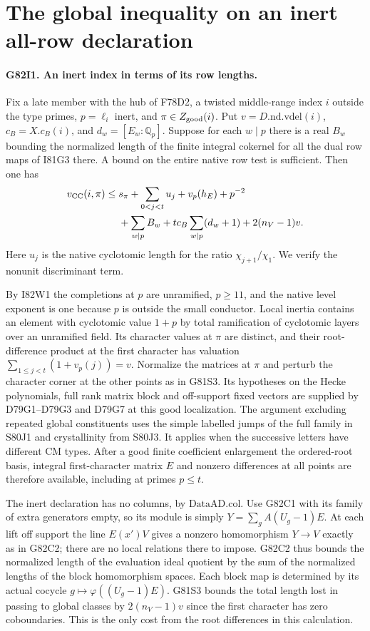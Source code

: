 \section{The global inequality on an inert all-row declaration}

\paragraph{G82I1. An inert index in terms of its row lengths.}
Fix a late member with the hub of F78D2, a twisted middle-range
index $i$ outside the type primes, $p=\ell_i$ inert, and
$\pi\in Z_{\rm good}(i)$. Put $v=D.\mathrm{nd.vdel}(i)$,
$c_B=X.c_B(i)$, and $d_w=[E_w:\mathbb Q_p]$. Suppose for each
$w\mid p$ there is a real $B_w$ bounding the normalized length
of the finite integral cokernel for all the dual row maps of
I81G3 there. A bound on the entire native row test is sufficient.
Then one has
\[
\begin{aligned}
 v_{\rm CC}(i,\pi)\le {}&
     s_\pi+\sum_{0<j<t}u_j+v_p(h_E)+p^{-2}\\
 &+\sum_{w\mid p} B_w+
       t c_B\sum_{w\mid p}(d_w+1)+2(n_V-1)v .
\end{aligned}
\]
Here $u_j$ is the native cyclotomic length for the ratio
$\chi_{j+1}/\chi_1$. We verify the nonunit discriminant term.

By I82W1 the completions at $p$ are unramified, $p\ge11$, and the
native level exponent is one because $p$ is outside the small
conductor. Local inertia contains an element with cyclotomic
value $1+p$ by total ramification of cyclotomic layers over an
unramified field. Its character values at $\pi$ are distinct,
and their root-difference product at the first character has
valuation $\sum_{1\le j<t}(1+v_p(j))=v$. Normalize the matrices
at $\pi$ and perturb the character corner at the other points
as in G81S3. Its hypotheses on the Hecke polynomials, full
rank matrix block and off-support fixed vectors are supplied by
D79G1--D79G3 and D79G7 at this good localization. The argument
excluding repeated global constituents uses the simple labelled
jumps of the full family in S80J1 and crystallinity from S80J3.
It applies when the successive letters have different CM types.
After a good finite coefficient enlargement the ordered-root basis,
integral first-character matrix $E$ and nonzero differences at
all points are therefore available, including at primes $p\le t$.

The inert declaration has no columns, by $\mathrm{DataAD.col}$.
Use G82C1 with its family of extra generators empty, so its
module is simply $Y=\sum_g A(U_g-1)E$. At each lift off support
the line $E(x')V$ gives a nonzero homomorphism $Y\to V$ exactly
as in G82C2; there are no local relations there to impose.
G82C2 thus bounds the normalized length of the evaluation ideal
quotient by the sum of the normalized lengths of the block
homomorphism spaces. Each block map is determined by its actual
cocycle $g\mapsto\varphi((U_g-1)E)$. G81S3 bounds the total
length lost in passing to global classes by $2(n_V-1)v$ since
the first character has zero coboundaries. This is the only
cost from the root differences in this calculation.


